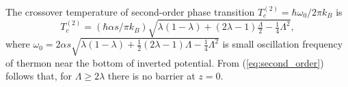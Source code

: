 \documentclass[aps, pre, preprint, groupedaddress, superscriptaddress, showkeys, showpacs] {revtex4-1}
\begin{document}
The crossover temperature of second-order phase transition $T_{c}^{(2)} = \hbar \omega_0/ 2 \pi k_B$ is 
%
\begin{equation}
T_{c}^{(2)} = (\hbar \alpha s / \pi k_B) \sqrt{\lambda (1 - \lambda) + (2 \lambda - 1) \tfrac{\Lambda}{2} - \tfrac{1}{4} \Lambda^2},
\label{eq:second_order}
\end{equation}
%
where $\omega_0 = 2 \alpha s \sqrt{\lambda (1 - \lambda) + \tfrac{1}{2} (2 \lambda - 1) \Lambda - \tfrac{1}{4} \Lambda^2}$ is small oscillation frequency of thermon near the bottom of inverted potential.
From (\ref{eq:second_order}) follows that, for $\Lambda \ge 2\lambda$ there is no barrier at $z = 0$.
%
\begin{figure}[ht]
\begin{minipage}[h]{0.49\linewidth}
\end{minipage}
\hfill
\begin{minipage}[h]{0.49\linewidth}

\end{minipage}
\end{figure}
\end{document}
